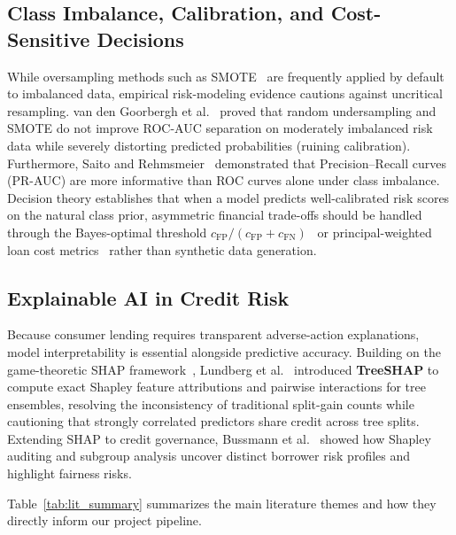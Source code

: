 \subsection{Class Imbalance, Calibration, and Cost-Sensitive Decisions}
While oversampling methods such as SMOTE~\cite{chawla2002} are frequently applied by default to imbalanced data, empirical risk-modeling evidence cautions against uncritical resampling. van den Goorbergh et al.~\cite{goorbergh2022} proved that random undersampling and SMOTE do not improve ROC-AUC separation on moderately imbalanced risk data while severely distorting predicted probabilities (ruining calibration). Furthermore, Saito and Rehmsmeier~\cite{saito2015} demonstrated that Precision--Recall curves (PR-AUC) are more informative than ROC curves alone under class imbalance. Decision theory establishes that when a model predicts well-calibrated risk scores on the natural class prior, asymmetric financial trade-offs should be handled through the Bayes-optimal threshold $c_{\text{FP}}/(c_{\text{FP}}+c_{\text{FN}})$~\cite{elkan2001} or principal-weighted loan cost metrics~\cite{bahnsen2014} rather than synthetic data generation.

\subsection{Explainable AI in Credit Risk}
Because consumer lending requires transparent adverse-action explanations, model interpretability is essential alongside predictive accuracy. Building on the game-theoretic SHAP framework~\cite{lundberg2017}, Lundberg et al.~\cite{lundberg2020} introduced \textbf{TreeSHAP} to compute exact Shapley feature attributions and pairwise interactions for tree ensembles, resolving the inconsistency of traditional split-gain counts while cautioning that strongly correlated predictors share credit across tree splits. Extending SHAP to credit governance, Bussmann et al.~\cite{bussmann2021} showed how Shapley auditing and subgroup analysis uncover distinct borrower risk profiles and highlight fairness risks.

Table~\ref{tab:lit_summary} summarizes the main literature themes and how they directly inform our project pipeline.


